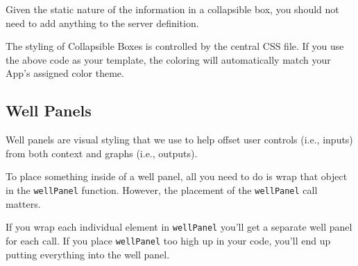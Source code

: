 \documentclass[
]{book}
\newenvironment{Shaded}{\begin{snugshade}}{\end{snugshade}}
\newcommand{\CommentTok}[1]{\textcolor[rgb]{0.56,0.35,0.01}{\textit{#1}}}
\newcommand{\DataTypeTok}[1]{\textcolor[rgb]{0.13,0.29,0.53}{#1}}
\newcommand{\KeywordTok}[1]{\textcolor[rgb]{0.13,0.29,0.53}{\textbf{#1}}}
\newcommand{\NormalTok}[1]{#1}
\newcommand{\OtherTok}[1]{\textcolor[rgb]{0.56,0.35,0.01}{#1}}
\newcommand{\StringTok}[1]{\textcolor[rgb]{0.31,0.60,0.02}{#1}}
\begin{document}
\begin{Shaded}
\end{Shaded}

Given the static nature of the information in a collapsible box, you should not need to add anything to the server definition.

The styling of Collapsible Boxes is controlled by the central CSS file. If you use the above code as your template, the coloring will automatically match your App's assigned color theme.

\hypertarget{well-panels}{%
\subsection{Well Panels}\label{well-panels}}

Well panels are visual styling that we use to help offset user controls (i.e., inputs) from both context and graphs (i.e., outputs).

To place something inside of a well panel, all you need to do is wrap that object in the \texttt{wellPanel} function. However, the placement of the \texttt{wellPanel} call matters.

If you wrap each individual element in \texttt{wellPanel} you'll get a separate well panel for each call. If you place \texttt{wellPanel} too high up in your code, you'll end up putting everything into the well panel.
\end{document}

